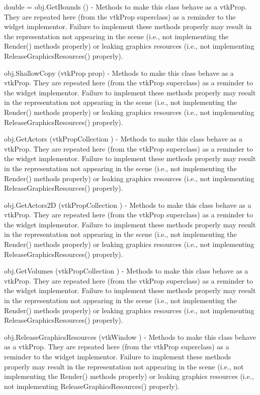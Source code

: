 \begin{DoxyItemize}
\item {\ttfamily double = obj.\-Get\-Bounds ()} -\/ Methods to make this class behave as a vtk\-Prop. They are repeated here (from the vtk\-Prop superclass) as a reminder to the widget implementor. Failure to implement these methods properly may result in the representation not appearing in the scene (i.\-e., not implementing the Render() methods properly) or leaking graphics resources (i.\-e., not implementing Release\-Graphics\-Resources() properly).  
\item {\ttfamily obj.\-Shallow\-Copy (vtk\-Prop prop)} -\/ Methods to make this class behave as a vtk\-Prop. They are repeated here (from the vtk\-Prop superclass) as a reminder to the widget implementor. Failure to implement these methods properly may result in the representation not appearing in the scene (i.\-e., not implementing the Render() methods properly) or leaking graphics resources (i.\-e., not implementing Release\-Graphics\-Resources() properly).  
\item {\ttfamily obj.\-Get\-Actors (vtk\-Prop\-Collection )} -\/ Methods to make this class behave as a vtk\-Prop. They are repeated here (from the vtk\-Prop superclass) as a reminder to the widget implementor. Failure to implement these methods properly may result in the representation not appearing in the scene (i.\-e., not implementing the Render() methods properly) or leaking graphics resources (i.\-e., not implementing Release\-Graphics\-Resources() properly).  
\item {\ttfamily obj.\-Get\-Actors2\-D (vtk\-Prop\-Collection )} -\/ Methods to make this class behave as a vtk\-Prop. They are repeated here (from the vtk\-Prop superclass) as a reminder to the widget implementor. Failure to implement these methods properly may result in the representation not appearing in the scene (i.\-e., not implementing the Render() methods properly) or leaking graphics resources (i.\-e., not implementing Release\-Graphics\-Resources() properly).  
\item {\ttfamily obj.\-Get\-Volumes (vtk\-Prop\-Collection )} -\/ Methods to make this class behave as a vtk\-Prop. They are repeated here (from the vtk\-Prop superclass) as a reminder to the widget implementor. Failure to implement these methods properly may result in the representation not appearing in the scene (i.\-e., not implementing the Render() methods properly) or leaking graphics resources (i.\-e., not implementing Release\-Graphics\-Resources() properly).  
\item {\ttfamily obj.\-Release\-Graphics\-Resources (vtk\-Window )} -\/ Methods to make this class behave as a vtk\-Prop. They are repeated here (from the vtk\-Prop superclass) as a reminder to the widget implementor. Failure to implement these methods properly may result in the representation not appearing in the scene (i.\-e., not implementing the Render() methods properly) or leaking graphics resources (i.\-e., not implementing Release\-Graphics\-Resources() properly).  

\end{DoxyItemize}
